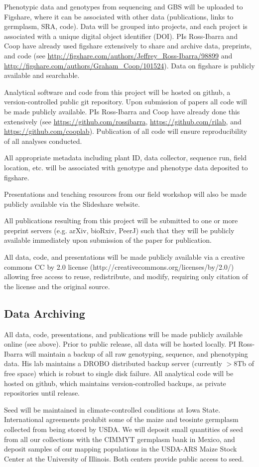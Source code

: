 Phenotypic data and genotypes from sequencing and GBS will be uploaded to Figshare, where it can be associated with other data (publications, links to germplasm, SRA, code). Data will be grouped into projects, and each project is associated with a unique digital object identifier (DOI). PIs Ross-Ibarra and Coop have already used figshare extensively to share and archive data, preprints, and code (see \url{http://figshare.com/authors/Jeffrey_Ross-Ibarra/98899}  and \url{http://figshare.com/authors/Graham_Coop/101524}). Data on figshare is publicly available and searchable.

Analytical software and code from this project will be hosted on github, a version-controlled public git repository.  Upon submission of papers all code will be made publicly available.  PIs Ross-Ibarra and Coop have already done this extensively (see \url{https://github.com/rossibarra}, \url{https://github.com/rilab}, and \url{https://github.com/cooplab}). Publication of all code will ensure reproducibility of all analyses conducted.  

All appropriate metadata including plant ID, data collector, sequence run, field location, etc. will be associated with genotype and phenotype data deposited to figshare. 

Presentations and teaching resources from our field workshop will also be made publicly available via the Slideshare website.

All publications resulting from this project will be submitted to one or more preprint servers (e.g. arXiv, bioRxiv, PeerJ) such that they will be publicly available immediately upon submission of the paper for publication.

All data, code, and presentations will be made publicly available via a creative commons CC by 2.0 license (http://creativecommons.org/licenses/by/2.0/) allowing free access to reuse, redistribute, and modify, requiring only citation of the license and the original source.

\subsection*{Data Archiving}

All data, code, presentations, and publications will be made publicly available online (see above).  Prior to public release, all data will be hosted locally.  PI Ross-Ibarra will maintain a backup of all raw genotyping, sequence, and phenotyping data.  His lab maintains a DROBO distributed backup server (currently $>8$Tb of free space) which is robust to single disk failure. All analytical code will be hosted on github, which maintains version-controlled backups, as private repositories until release. 

Seed will be maintained in climate-controlled conditions at Iowa State. International agreements prohibit some of the maize and teosinte germplasm collected from being stored by USDA.  We will deposit small quantities of seed from all our collections with the CIMMYT germplasm bank in Mexico, and deposit samples of our mapping populations in the USDA-ARS Maize Stock Center at the University of Illinois.  Both centers provide public access to seed.

